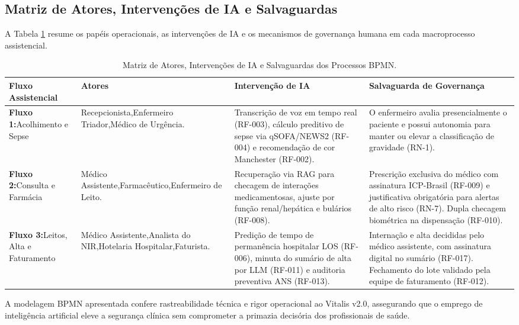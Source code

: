 \subsection{Matriz de Atores, Intervenções de IA e Salvaguardas}
\label{subsec:bpmn_matriz}

A Tabela \ref{tab:matriz_bpmn} resume os papéis operacionais, as intervenções de IA e os mecanismos de governança humana em cada macroprocesso assistencial.

\begin{table}[H]
\centering
\small
\renewcommand{\arraystretch}{1.2}
\begin{tabularx}{\textwidth}{>{\raggedright\arraybackslash}p{2.8cm} >{\raggedright\arraybackslash}p{2.8cm} >{\raggedright\arraybackslash}p{4.6cm} >{\raggedright\arraybackslash}X}
\toprule
\textbf{Fluxo Assistencial} & \textbf{Atores} & \textbf{Intervenção de IA} & \textbf{Salvaguarda de Governança} \\
\midrule
\textbf{Fluxo 1:}\newline Acolhimento e Sepse &
Recepcionista,\newline Enfermeiro Triador,\newline Médico de Urgência. &
Transcrição de voz em tempo real (RF-003), cálculo preditivo de sepse via qSOFA/NEWS2 (RF-004) e recomendação de cor Manchester (RF-002). &
O enfermeiro avalia presencialmente o paciente e possui autonomia para manter ou elevar a classificação de gravidade (RN-1). \\
\midrule
\textbf{Fluxo 2:}\newline Consulta e Farmácia &
Médico Assistente,\newline Farmacêutico,\newline Enfermeiro de Leito. &
Recuperação via RAG para checagem de interações medicamentosas, ajuste por função renal/hepática e bulários (RF-008). &
Prescrição exclusiva do médico com assinatura ICP-Brasil (RF-009) e justificativa obrigatória para alertas de alto risco (RN-7). Dupla checagem biométrica na dispensação (RF-010). \\
\midrule
\textbf{Fluxo 3:}\newline Leitos, Alta e Faturamento &
Médico Assistente,\newline Analista do NIR,\newline Hotelaria Hospitalar,\newline Faturista. &
Predição de tempo de permanência hospitalar LOS (RF-006), minuta do sumário de alta por LLM (RF-011) e auditoria preventiva ANS (RF-013). &
Internação e alta decididas pelo médico assistente, com assinatura digital no sumário (RF-017). Fechamento do lote validado pela equipe de faturamento (RF-012). \\
\bottomrule
\end{tabularx}
\caption{Matriz de Atores, Intervenções de IA e Salvaguardas dos Processos BPMN.}
\label{tab:matriz_bpmn}
\end{table}

A modelagem BPMN apresentada confere rastreabilidade técnica e rigor operacional ao Vitalis v2.0, assegurando que o emprego de inteligência artificial eleve a segurança clínica sem comprometer a primazia decisória dos profissionais de saúde.

